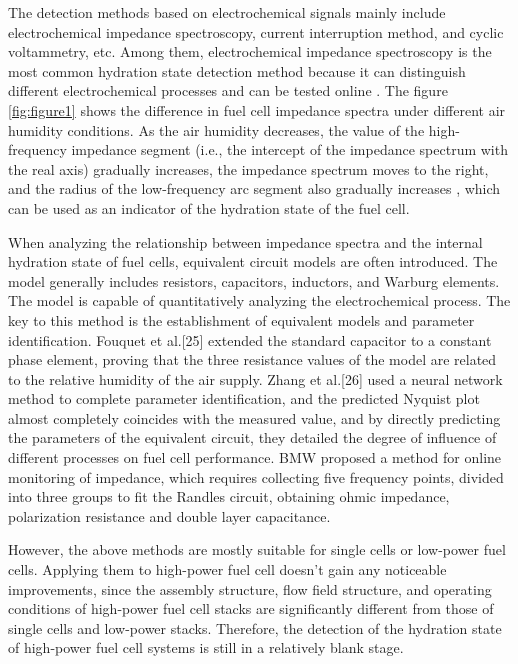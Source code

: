 The detection methods based on electrochemical signals mainly include electrochemical impedance spectroscopy, current interruption method, and cyclic voltammetry, etc. Among them, electrochemical impedance spectroscopy is the most common hydration state detection method because it can distinguish different electrochemical processes and can be tested online \cite{yousfisteinerDiagnosisPolymerElectrolyte2011,chenOperationCharacteristicsCarbon2015}. The figure \ref{fig:figure1} shows the difference in fuel cell impedance spectra under different air humidity conditions. As the air humidity decreases, the value of the high-frequency impedance segment (i.e., the intercept of the impedance spectrum with the real axis) gradually increases, the impedance spectrum moves to the right, and the radius of the low-frequency arc segment also gradually increases \cite{hussainiVisualizationQuantificationCathode2009}, which can be used as an indicator of the hydration state of the fuel cell.
\par
When analyzing the relationship between impedance spectra and the internal hydration state of fuel cells, equivalent circuit models are often introduced. The model generally includes resistors, capacitors, inductors, and Warburg elements\cite{tangRecentProgressUse2020}. The model is capable of quantitatively analyzing the electrochemical process.  The key to this method is the establishment of equivalent models and parameter identification. Fouquet et al.[25] extended the standard capacitor to a constant phase element, proving that the three resistance values of the model are related to the relative humidity of the air supply. Zhang et al.[26] used a neural network method to complete parameter identification, and the predicted Nyquist plot almost completely coincides with the measured value, and by directly predicting the parameters of the equivalent circuit, they detailed the degree of influence of different processes on fuel cell performance. BMW proposed a method for online monitoring of impedance, which requires collecting five frequency points, divided into three groups to fit the Randles circuit, obtaining ohmic impedance, polarization resistance and double layer capacitance\cite{fouquetModelBasedPEM2006}. 
\par
However, the above methods are mostly suitable for single cells or low-power fuel cells. Applying them to high-power fuel cell doesn't gain any noticeable improvements\cite{tangRecentProgressUse2020,jiangMicrobialFuelCell2018,dotelliCombiningElectricalPressure2016,millerReviewPolymerElectrolyte2011,nagulapatiMachineLearningBased2023}, since the assembly structure, flow field structure, and operating conditions of high-power fuel cell stacks are significantly different from those of single cells and low-power stacks.  Therefore, the detection of the hydration state of high-power fuel cell systems is still in a relatively blank stage.
